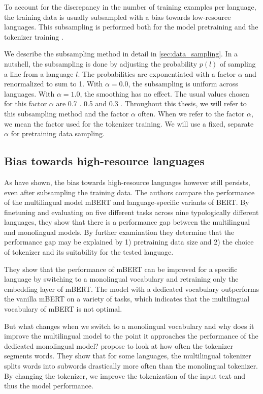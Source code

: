 To account for the discrepancy in the number of training examples per language, the training data is usually subsampled with a bias towards low-resource languages. This subsampling is performed both for the model pretraining and the tokenizer training \cite{devlin_bertmultilingualmd_2019,lample_cross-lingual_2019}.

We describe the subsampling method in detail in \autoref{sec:data_sampling}. In a nutshell, the subsampling is done by adjusting the probability $p(l)$ of sampling a line from a language $l$. The probabilities are exponentiated with a factor $\alpha$ and renormalized to sum to 1. With $\alpha=0.0$, the subsampling is uniform across languages. With $\alpha=1.0$, the smoothing has no effect. The usual values chosen for this factor $\alpha$ are 0.7 \cite{devlin_bert_2019}. 0.5 \cite{lample_cross-lingual_2019} and 0.3 \cite{conneau_unsupervised_2020}. Throughout this thesis, we will refer to this subsampling method and the factor $\alpha$ often. When we refer to the factor $\alpha$, we mean the factor used for the tokenizer training. We will use a fixed, separate $\alpha$ for pretraining data sampling.

\subsection{Bias towards high-resource languages}

As \citet{rust_how_2021} have shown, the bias towards high-resource languages however still persists, even after subsampling the training data. The authors compare the performance of the multilingual model mBERT and language-specific variants of BERT. By finetuning and evaluating on five different tasks across nine typologically different languages, they show that there is a performance gap between the multilingual and monolingual models. By further examination they determine that the performance gap may be explained by 1) pretraining data size and 2) the choice of tokenizer and its suitability for the tested language. 

They show that the performance of mBERT can be improved for a specific language by switching to a monolingual vocabulary and retraining only the embedding layer of mBERT. The model with a dedicated vocabulary outperforms the vanilla mBERT on a variety of tasks, which indicates that the multilingual vocabulary of mBERT is not optimal. 

But what changes when we switch to a monolingual vocabulary and why does it improve the multilingual model to the point it approaches the performance of the dedicated monolingual model? \citet{rust_how_2021} propose to look at how often the tokenizer segments words. They show that for some languages, the multilingual tokenizer splits words into subwords drastically more often than the monolingual tokenizer. By changing the tokenizer, we improve the tokenization of the input text and thus the model performance.

